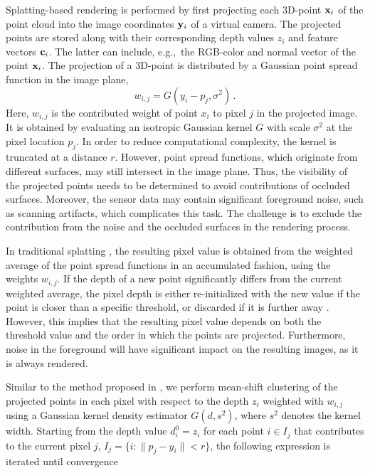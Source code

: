 \documentclass[runningheads,a4paper]{llncs}
\begin{document}
Splatting-based rendering is performed by first projecting each 3D-point ${\bf x}_i$ of the point cloud into the image coordinates ${\bf y}_i$ of a virtual camera. The projected points are stored along with their corresponding depth values $z_i$ and feature vectors ${\bf c}_i$. The latter can include, e.g.,\ the RGB-color and normal vector of the point ${\bf x}_i$. The projection of a 3D-point is distributed by a Gaussian point spread function in the image plane,
\begin{equation}
	w_{i,j} = G(y_i - p_j, \sigma^2) \,.
	\label{eq:splatt_weight}
\end{equation}
Here, $w_{i,j}$ is the contributed weight of point $x_i$ to pixel $j$ in the projected image. It is obtained by evaluating an isotropic Gaussian kernel $G$ with scale $\sigma^2$ at the pixel location $p_j$. In order to reduce computational complexity, the kernel is truncated at a distance $r$. However, point spread functions, which originate from different surfaces, may still intersect in the image plane. Thus, the visibility of the projected points needs to be determined to avoid contributions of occluded surfaces.  Moreover, the sensor data may contain significant foreground noise, such as scanning artifacts, which complicates this task. The challenge is to exclude the contribution from the noise and the occluded surfaces in the rendering process. 





In traditional splatting \cite{zwicker2001surface}, the resulting pixel value is obtained from the weighted average of the point spread functions in an accumulated fashion, using the weights $w_{i,j}$. If the depth of a new point significantly differs from the current weighted average, the pixel depth is either re-initialized with the new value if the point is closer than a specific threshold, or discarded if it is further away \cite{zwicker2001surface}. However, this implies that the resulting pixel value depends on both the threshold value and the order in which the points are projected. Furthermore, noise in the foreground will have significant impact on the resulting images, as it is always rendered.

Similar to the method proposed in \cite{ogniewski17}, we perform mean-shift clustering \cite{szeliski10} of the projected points in each pixel with respect to the depth $z_i$ weighted with $w_{i,j}$ using a Gaussian kernel density estimator $G(d, s^2)$, where $s^2$ denotes the kernel width. Starting from the depth value $d^0_i = z_i$ for each point $i \in I_j$ that contributes to the current pixel $j$, $I_j = \{i: \|p_j - y_i \| < r \}$, the following expression is iterated until convergence
\end{document}
